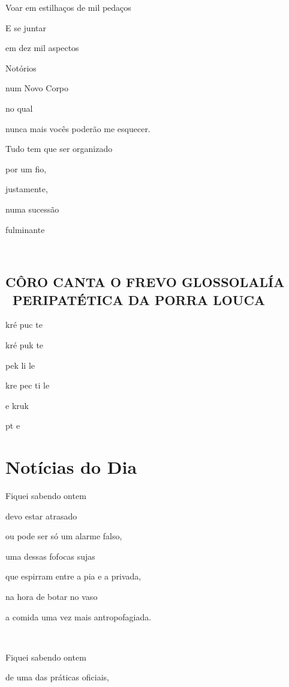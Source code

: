 Voar em estilhaços de mil pedaços~

E se juntar~

em dez mil aspectos~

Notórios~

num Novo Corpo~

no qual~

nunca mais vocês poderão me esquecer.



Tudo tem que ser organizado

por um fio,

justamente,

numa sucessão

fulminante

~

\section*{CÔRO CANTA O FREVO GLOSSOLALÍA ~PERIPATÉTICA DA PORRA LOUCA}

\begin{center}
kré puc te

kré puk te

pek li le

kre pec ti le

e kruk

pt e
\end{center}


\chapter{Notícias do Dia}



Fiquei sabendo ontem

devo estar atrasado

ou pode ser só um alarme falso,

uma dessas fofocas sujas

que espirram entre a pia e a privada, 

na hora de botar no vaso

a comida uma vez mais antropofagiada.

~

Fiquei sabendo ontem

de uma das práticas oficiais, 


